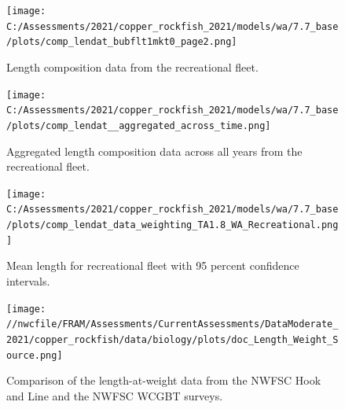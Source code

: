 \documentclass[11pt,
  english,
  a4paper,
]{article}
\begin{document}
\tagmcend\tagstructend


\begin{figure}
\centering
\texttt{[image: C:/Assessments/2021/copper\_rockfish\_2021/models/wa/7.7\_base/plots/comp\_lendat\_bubflt1mkt0\_page2.png]}
\caption{Length composition data from the recreational fleet.\label{fig:wa-len-data}}
\end{figure}

\tagmcend\tagstructend


\begin{figure}
\centering
\texttt{[image: C:/Assessments/2021/copper\_rockfish\_2021/models/wa/7.7\_base/plots/comp\_lendat\_\_aggregated\_across\_time.png]}
\caption{Aggregated length composition data across all years from the recreational fleet.\label{fig:wa-len-agg}}
\end{figure}

\tagmcend\tagstructend


\begin{figure}
\centering
\texttt{[image: C:/Assessments/2021/copper\_rockfish\_2021/models/wa/7.7\_base/plots/comp\_lendat\_data\_weighting\_TA1.8\_WA\_Recreational.png]}
\caption{Mean length for recreational fleet with 95 percent confidence intervals.\label{fig:mean-len-data}}
\end{figure}

\tagmcend\tagstructend


\begin{figure}
\centering
\texttt{[image: //nwcfile/FRAM/Assessments/CurrentAssessments/DataModerate\_2021/copper\_rockfish/data/biology/plots/doc\_Length\_Weight\_Source.png]}
\caption{Comparison of the length-at-weight data from the NWFSC Hook and Line and the NWFSC WCGBT surveys.\label{fig:len-weight-survey}}
\end{figure}
\end{document}
